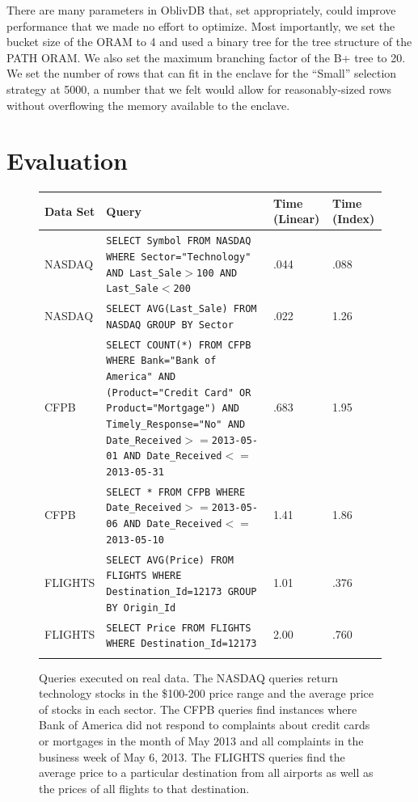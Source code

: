 \documentclass[USenglish,oneside,twocolumn]{article}
\def\name/{OblivDB}
\begin{document}
There are many parameters in \name/ that, set appropriately, could improve performance that we made no effort to optimize. Most importantly, we set the bucket size of the ORAM to 4 and used a binary tree for the tree structure of the PATH ORAM. We also set the maximum branching factor of the B+ tree to 20. We set the number of rows that can fit in the enclave for the ``Small'' selection strategy at 5000, a number that we felt would allow for reasonably-sized rows without overflowing the memory available to the enclave. 

\section{Evaluation}\label{eval}
\begin{figure}
\begin{tabular}{l p{7cm} l l}
 \textbf{Data Set}& \textbf{Query}& \textbf{Time (Linear)} & \textbf{Time (Index)}\\ \hline\rule{0pt}{3ex}
NASDAQ & \texttt{SELECT Symbol FROM NASDAQ WHERE Sector="Technology" AND Last\_Sale$>$100 AND Last\_Sale$<$200} & .044 & .088\\ \rule{0pt}{3ex}
NASDAQ & \texttt{SELECT AVG(Last\_Sale) FROM NASDAQ GROUP BY Sector}& .022 & 1.26\\\rule{0pt}{3ex}
CFPB & \texttt{SELECT COUNT(*) FROM CFPB WHERE Bank="Bank of America" AND (Product="Credit Card" OR Product="Mortgage") AND Timely\_Response="No" AND Date\_Received$>=$2013-05-01 AND Date\_Received$<=$2013-05-31 }& .683 & 1.95\\\rule{0pt}{3ex}
CFPB & \texttt{SELECT * FROM CFPB WHERE Date\_Received$>=$2013-05-06 AND Date\_Received$<=$2013-05-10 } & 1.41 & 1.86\\\rule{0pt}{3ex} 
FLIGHTS & \texttt{SELECT AVG(Price) FROM FLIGHTS WHERE Destination\_Id=12173 GROUP BY Origin\_Id}& 1.01 & .376\\\rule{0pt}{3ex}
FLIGHTS &\texttt{SELECT Price FROM FLIGHTS WHERE Destination\_Id=12173} & 2.00 & .760\\\rule{0pt}{3ex}
\end{tabular}
\caption{Queries executed on real data. The NASDAQ queries return technology stocks in the \$100-200 price range and the average price of stocks in each sector. The CFPB queries find instances where Bank of America did not respond to complaints about credit cards or mortgages in the month of May 2013 and all complaints in the business week of May 6, 2013. The FLIGHTS queries find the average price to a particular destination from all airports as well as the prices of all flights to that destination.}
\label{figQueries}
\end{figure}
\end{document}
